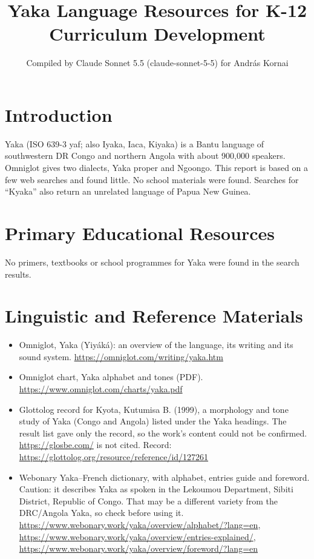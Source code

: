 \documentclass[12pt]{article}
\title{Yaka Language Resources for K-12 Curriculum Development}
\author{Compiled by Claude Sonnet 5.5 (claude-sonnet-5-5) for Andr\'as Kornai}
\date{}
\begin{document}
\maketitle

\section{Introduction}
Yaka (ISO 639-3 yaf; also Iyaka, Iaca, Kiyaka) is a Bantu language of southwestern DR Congo and northern Angola with about 900,000 speakers. Omniglot gives two dialects, Yaka proper and Ngoongo. This report is based on a few web searches and found little. No school materials were found. Searches for ``Kyaka'' also return an unrelated language of Papua New Guinea.

\section{Primary Educational Resources}
No primers, textbooks or school programmes for Yaka were found in the search results.

\section{Linguistic and Reference Materials}
\begin{itemize}
\item Omniglot, Yaka (Yiy\'ak\'a): an overview of the language, its writing and its sound system. \url{https://omniglot.com/writing/yaka.htm}
\item Omniglot chart, Yaka alphabet and tones (PDF). \url{https://www.omniglot.com/charts/yaka.pdf}
\item Glottolog record for Kyota, Kutumisa B. (1999), a morphology and tone study of Yaka (Congo and Angola) listed under the Yaka headings. The result list gave only the record, so the work's content could not be confirmed. \url{https://glosbe.com/} is not cited. Record: \url{https://glottolog.org/resource/reference/id/127261}
\item Webonary Yaka--French dictionary, with alphabet, entries guide and foreword. Caution: it describes Yaka as spoken in the Lekoumou Department, Sibiti District, Republic of Congo. That may be a different variety from the DRC/Angola Yaka, so check before using it. \url{https://www.webonary.work/yaka/overview/alphabet/?lang=en}, \url{https://www.webonary.work/yaka/overview/entries-explained/}, \url{https://www.webonary.work/yaka/overview/foreword/?lang=en}
\end{itemize}
\end{document}
